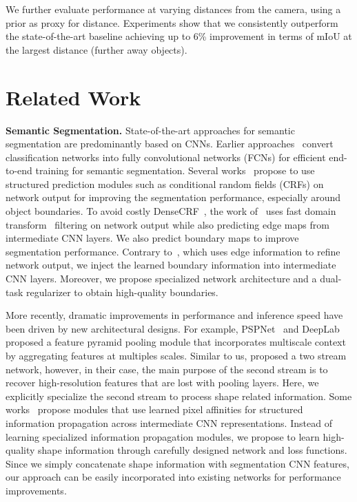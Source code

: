 \documentclass[10pt,twocolumn,letterpaper]{article}
\begin{document}
We further evaluate performance at varying distances from the camera, using a prior as proxy for distance. Experiments show that we consistently outperform the state-of-the-art baseline achieving up to 6\% improvement in terms of mIoU at the largest distance (\ie further away objects).

 \vspace{-0mm}
\vspace{-1mm}
\section{Related Work}
\label{sec:related}

\vspace{1mm}
\noindent \textbf{Semantic Segmentation.}
State-of-the-art approaches for semantic segmentation are predominantly based on CNNs. 
Earlier approaches~\cite{LongCVPR2015,chen2014semantic} convert classification networks into fully convolutional networks (FCNs) for efficient end-to-end training for semantic segmentation.
Several works~\cite{deeplab,lin2016efficient,zheng2015conditional,SchwingTR2015,HeCVPR2014,Arnab16,liu2015semantic,jampani2016learning,chandra2016fast} propose to use structured prediction modules such as conditional random fields (CRFs) on network output for improving the segmentation performance, especially around object boundaries.
To avoid costly DenseCRF~\cite{krahenbuhl2011efficient}, the work of~\cite{chen2016semantic} uses fast domain transform~\cite{gastal2011domain} filtering on network output while also predicting edge maps from intermediate CNN layers.
We also predict boundary maps to improve segmentation performance. Contrary to~\cite{chen2016semantic}, which uses edge information to refine network output, we inject the learned boundary information into intermediate CNN layers. Moreover, we propose specialized network architecture and a dual-task regularizer to obtain high-quality boundaries.

More recently, dramatic improvements in performance and inference speed have been driven by new architectural designs.
For example, 
PSPNet~\cite{pspnet} and DeepLab \cite{deeplab,deeplabv3plus2018} proposed a feature pyramid pooling module that incorporates multiscale context by aggregating features at multiples scales.
Similar to us,
\cite{pohlen2016full} proposed a two stream network, however, in their case, the main purpose of the second stream
is to recover high-resolution features that are lost with pooling layers. Here, we explicitly specialize the second stream to process shape related information. 
Some works~\cite{gadde2016superpixel,liu2017learning,wang2018non} propose modules that use learned pixel affinities for structured information propagation across intermediate CNN representations. Instead of learning specialized information propagation modules, we propose to learn high-quality shape information through carefully designed network and loss functions. Since we simply concatenate shape information with segmentation CNN features, our approach can be easily incorporated into existing networks for performance improvements.
\end{document}
